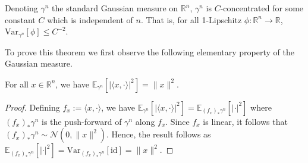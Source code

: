 \begin{theorem}\label{thm:gaussian_conc}
  Denoting \(\gamma^n\) the standard Gaussian measure on \(\mathbb{R}^n\), \(\gamma^n\) is \(C\)-concentrated 
  for some constant \(C\) which is independent of \(n\). That is, for all 1-Lipschitz 
  \(\phi : \mathbb{R}^n \to \mathbb{R}\), \(\text{Var}_{\gamma^n}[\phi] \le C^{-2}\).
\end{theorem}

To prove this theorem we first observe the following elementary property of the Gaussian measure.

\begin{lemma}\label{lem:gaussian_inner}
  For all \(x \in \mathbb{R}^n\), we have 
  \(\mathbb{E}_{\gamma^n}[|\langle x, \cdot \rangle|^2] = \|x\|^2\).
\end{lemma}
\begin{proof}
  Defining \(f_x := \langle x, \cdot \rangle\), we have 
  \(\mathbb{E}_{\gamma^n}[|\langle x, \cdot \rangle|^2] = \mathbb{E}_{(f_x)_* \gamma^n}[|\cdot |^2]\) where 
  \((f_x)_* \gamma^n\) is the push-forward of \(\gamma^n\) along \(f_x\). Since \(f_x\) is linear, it follows 
  that \((f_x)_* \gamma^n \sim \mathcal{N}(0, \|x\|^2)\). Hence, the result follows as 
  \(\mathbb{E}_{(f_x)_* \gamma^n}[|\cdot |^2] = \text{Var}_{(f_x)_* \gamma^n}[\text{id}] = \|x\|^2\).
\end{proof}

